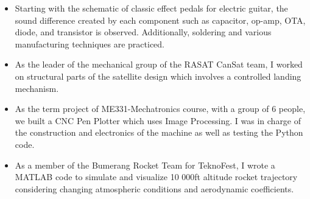 \documentclass[10pt,a4paper,ragged2e,withhyper]{altacv}
\begin{document}
    \begin{paracol}{2}
        \begin{itemize}
            \item Starting with the schematic of classic effect pedals for electric guitar, the sound difference created by each component such as capacitor, op-amp, OTA, diode, and transistor is observed. Additionally, soldering and various manufacturing techniques are practiced. 
        \end{itemize}
        \divider

        \begin{itemize}
            \item As the leader of the mechanical group of the RASAT CanSat team, I worked on structural parts of the satellite design which involves a controlled landing mechanism. 
        \end{itemize}
              
        \switchcolumn
        \begin{itemize}
            \item As the term project of ME331-Mechatronics course, with a group of 6 people, we built a CNC Pen Plotter which uses Image Processing. I was in charge of the construction and electronics of the machine as well as testing the Python code.
        \end{itemize}
        \divider
        
        \begin{itemize}
            \item As a member of the Bumerang Rocket Team for TeknoFest, I wrote a MATLAB code to simulate and visualize 10 000ft altitude rocket trajectory considering changing atmospheric conditions and aerodynamic coefficients.
        \end{itemize}
    \end{paracol}   
        
\end{document}
